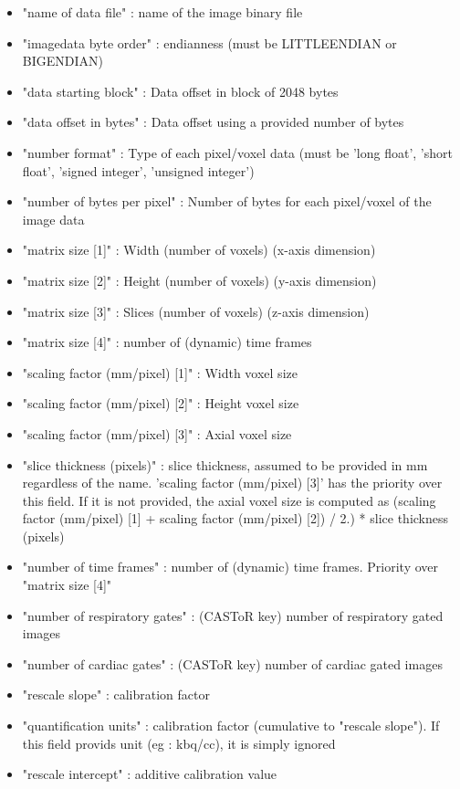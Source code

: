 \documentclass[a4paper, 11pt]{article}
\begin{document}
\begin{itemize}
  \item "name of data file" : name of the image binary file
  \item "imagedata byte order" : endianness (must be LITTLEENDIAN or BIGENDIAN)
  \item "data starting block" : Data offset in block of 2048 bytes
  \item "data offset in bytes" : Data offset using a provided number of bytes
  \item "number format" : Type of each pixel/voxel data (must be 'long float', 'short float', 'signed integer', 'unsigned integer')
  \item "number of bytes per pixel" : Number of bytes for each pixel/voxel of the image data
  \item "matrix size [1]" : Width (number of voxels) (x-axis dimension)
  \item "matrix size [2]" : Height (number of voxels) (y-axis dimension)
  \item "matrix size [3]" : Slices (number of voxels) (z-axis dimension)
  \item "matrix size [4]" : number of (dynamic) time frames
  \item "scaling factor (mm/pixel) [1]"  : Width voxel size
  \item "scaling factor (mm/pixel) [2]"  : Height voxel size
  \item "scaling factor (mm/pixel) [3]"  : Axial voxel size
  \item "slice thickness (pixels)" : slice thickness, assumed to be provided in mm regardless of the name.
        'scaling factor (mm/pixel) [3]' has the priority over this field. If it is not provided, the axial voxel size is computed as (scaling
        factor (mm/pixel) [1] + scaling factor (mm/pixel) [2]) / 2.) * slice thickness (pixels)
  \item "number of time frames" : number of (dynamic) time frames. Priority over "matrix size [4]"
  \item "number of respiratory gates" : (CASToR key) number of respiratory gated images
  \item "number of cardiac gates" : (CASToR key) number of cardiac gated images
  \item "rescale slope" : calibration factor
  \item "quantification units" : calibration factor (cumulative to "rescale slope"). If this field provids unit (eg : kbq/cc), it is simply ignored
  \item "rescale intercept" : additive calibration value

\end{itemize}
\end{document}
